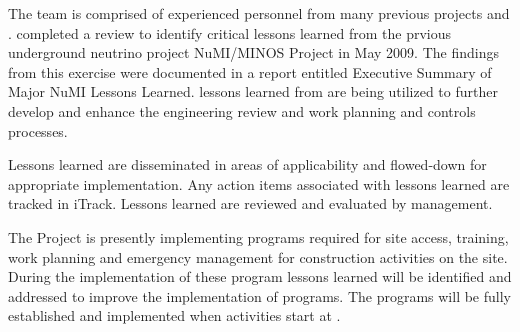 The  team is comprised of experienced personnel from many
previous projects and .  \fnal completed a review to
identify critical lessons learned from the prvious underground
neutrino project NuMI/MINOS Project in May 2009. The findings from this
exercise were documented in a report entitled Executive Summary of
Major NuMI Lessons Learned.   lessons learned from
 are being utilized to further develop and enhance
the  engineering review and work planning and controls
processes.

Lessons learned are disseminated in areas of applicability and
flowed-down for appropriate implementation. Any action items
associated with lessons learned are tracked in iTrack. Lessons learned
are reviewed and evaluated by \fnal management.

The  Project is presently implementing 
programs required for site access, training, work planning and
emergency management for construction activities on the 
site. During the implementation of these program lessons learned will
be identified and addressed to improve the implementation of
 programs.  The  programs will be fully
established and implemented when  activities start at
.
